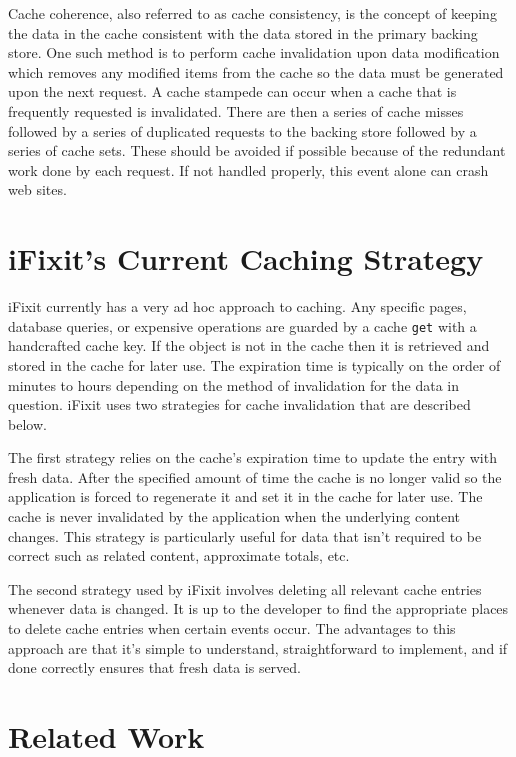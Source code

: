 \documentclass[12pt]{ucthesis}
\begin{document}
Cache coherence, also referred to as cache consistency, is the concept of keeping the data in the cache consistent with the data stored in the primary backing store.
One such method is to perform cache invalidation upon data modification which removes any modified items from the cache so the data must be generated upon the next request.
A cache stampede can occur when a cache that is frequently requested is invalidated.
There are then a series of cache misses followed by a series of duplicated requests to the backing store followed by a series of cache sets.
These should be avoided if possible because of the redundant work done by each request.
If not handled properly, this event alone can crash web sites.


\section{iFixit's Current Caching Strategy}
iFixit currently has a very ad hoc approach to caching.
Any specific pages, database queries, or expensive operations are guarded by a cache {\tt get} with a handcrafted cache key.
If the object is not in the cache then it is retrieved and stored in the cache for later use.
The expiration time is typically on the order of minutes to hours depending on the method of invalidation for the data in question.
iFixit uses two strategies for cache invalidation that are described below.

The first strategy relies on the cache's expiration time to update the entry with fresh data.
After the specified amount of time the cache is no longer valid so the application is forced to regenerate it and set it in the cache for later use.
The cache is never invalidated by the application when the underlying content changes.
This strategy is particularly useful for data that isn't required to be correct such as related content, approximate totals, etc.

The second strategy used by iFixit involves deleting all relevant cache entries whenever data is changed.
It is up to the developer to find the appropriate places to delete cache entries when certain events occur.
The advantages to this approach are that it's simple to understand, straightforward to implement, and if done correctly ensures that fresh data is served.



\section{Related Work}
\end{document}
